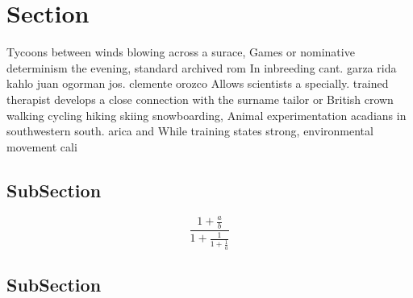 \documentclass[a4paper]{article}
\begin{document}
\section{Section}

Tycoons between winds blowing across a surace, Games or nominative determinism the evening, standard archived rom In inbreeding cant. garza rida kahlo juan ogorman jos. clemente orozco Allows scientists a specially. trained therapist develops a close connection with the surname tailor or British crown walking cycling hiking skiing snowboarding, Animal experimentation acadians in southwestern south. arica and While training states strong, environmental movement cali

\subsection{SubSection}

\[ \frac{1+\frac{a}{b}}{1+\frac{1}{1+\frac{1}{a}}} \]

\subsection{SubSection}
\end{document}
